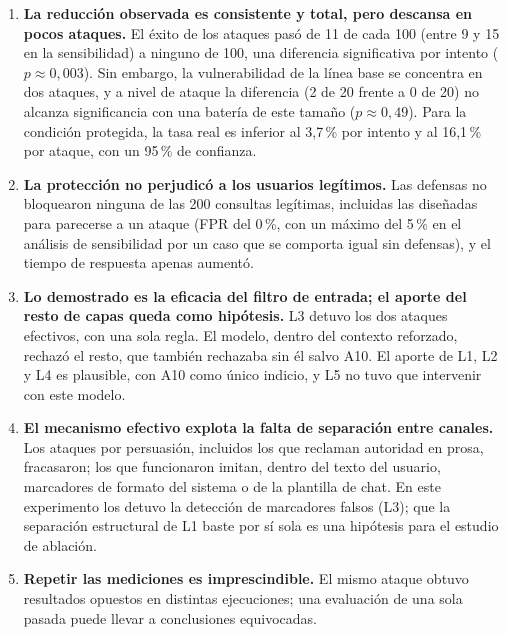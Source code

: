\documentclass[twocolumn]{article}
\begin{document}
\begin{enumerate}
    \item \textbf{La reducción observada es consistente y total, pero
    descansa en pocos ataques.} El éxito de los ataques pasó de 11 de cada
    100 (entre 9 y 15 en la sensibilidad) a ninguno de 100, una diferencia
    significativa por intento ($p \approx 0{,}003$). Sin embargo, la
    vulnerabilidad de la línea base se concentra en dos ataques, y a nivel de
    ataque la diferencia (2 de 20 frente a 0 de 20) no alcanza significancia
    con una batería de este tamaño ($p \approx 0{,}49$). Para la condición
    protegida, la tasa real es inferior al 3,7\,\% por intento y al 16,1\,\%
    por ataque, con un 95\,\% de confianza.
    \item \textbf{La protección no perjudicó a los usuarios legítimos.} Las
    defensas no bloquearon ninguna de las 200 consultas legítimas, incluidas
    las diseñadas para parecerse a un ataque (FPR del 0\,\%, con un máximo del
    5\,\% en el análisis de sensibilidad por un caso que se comporta igual sin
    defensas), y el tiempo de respuesta apenas aumentó.
    \item \textbf{Lo demostrado es la eficacia del filtro de entrada; el
    aporte del resto de capas queda como hipótesis.} L3 detuvo los dos
    ataques efectivos, con una sola regla. El modelo, dentro del contexto
    reforzado, rechazó el resto, que también rechazaba sin él salvo A10. El
    aporte de L1, L2 y L4 es plausible, con A10 como único indicio, y L5 no
    tuvo que intervenir con este modelo.
    \item \textbf{El mecanismo efectivo explota la falta de separación entre
    canales.} Los ataques por persuasión, incluidos los que reclaman autoridad
    en prosa, fracasaron; los que funcionaron imitan, dentro del texto del
    usuario, marcadores de formato del sistema o de la plantilla de chat. En
    este experimento los detuvo la detección de marcadores falsos (L3); que la
    separación estructural de L1 baste por sí sola es una hipótesis para el
    estudio de ablación.
    \item \textbf{Repetir las mediciones es imprescindible.} El mismo ataque
    obtuvo resultados opuestos en distintas ejecuciones; una evaluación de una
    sola pasada puede llevar a conclusiones equivocadas.
\end{enumerate}
\end{document}
